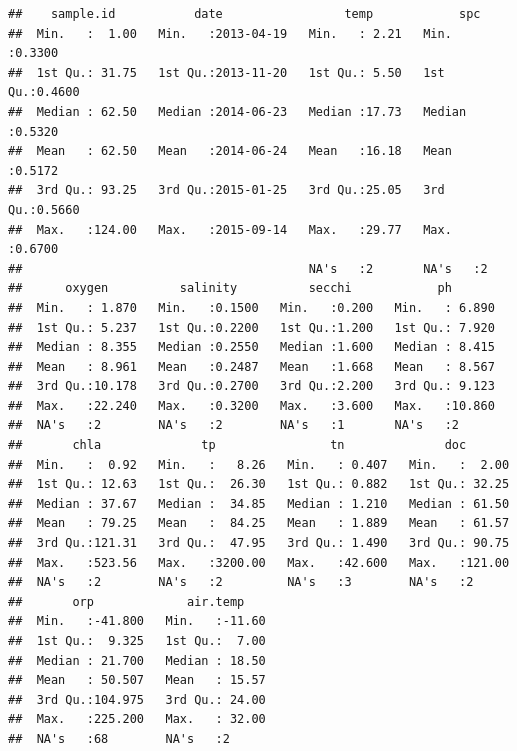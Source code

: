 \documentclass[]{article}
\begin{document}
\begin{verbatim}
##    sample.id           date                 temp            spc        
##  Min.   :  1.00   Min.   :2013-04-19   Min.   : 2.21   Min.   :0.3300  
##  1st Qu.: 31.75   1st Qu.:2013-11-20   1st Qu.: 5.50   1st Qu.:0.4600  
##  Median : 62.50   Median :2014-06-23   Median :17.73   Median :0.5320  
##  Mean   : 62.50   Mean   :2014-06-24   Mean   :16.18   Mean   :0.5172  
##  3rd Qu.: 93.25   3rd Qu.:2015-01-25   3rd Qu.:25.05   3rd Qu.:0.5660  
##  Max.   :124.00   Max.   :2015-09-14   Max.   :29.77   Max.   :0.6700  
##                                        NA's   :2       NA's   :2       
##      oxygen          salinity          secchi            ph        
##  Min.   : 1.870   Min.   :0.1500   Min.   :0.200   Min.   : 6.890  
##  1st Qu.: 5.237   1st Qu.:0.2200   1st Qu.:1.200   1st Qu.: 7.920  
##  Median : 8.355   Median :0.2550   Median :1.600   Median : 8.415  
##  Mean   : 8.961   Mean   :0.2487   Mean   :1.668   Mean   : 8.567  
##  3rd Qu.:10.178   3rd Qu.:0.2700   3rd Qu.:2.200   3rd Qu.: 9.123  
##  Max.   :22.240   Max.   :0.3200   Max.   :3.600   Max.   :10.860  
##  NA's   :2        NA's   :2        NA's   :1       NA's   :2       
##       chla              tp                tn              doc        
##  Min.   :  0.92   Min.   :   8.26   Min.   : 0.407   Min.   :  2.00  
##  1st Qu.: 12.63   1st Qu.:  26.30   1st Qu.: 0.882   1st Qu.: 32.25  
##  Median : 37.67   Median :  34.85   Median : 1.210   Median : 61.50  
##  Mean   : 79.25   Mean   :  84.25   Mean   : 1.889   Mean   : 61.57  
##  3rd Qu.:121.31   3rd Qu.:  47.95   3rd Qu.: 1.490   3rd Qu.: 90.75  
##  Max.   :523.56   Max.   :3200.00   Max.   :42.600   Max.   :121.00  
##  NA's   :2        NA's   :2         NA's   :3        NA's   :2       
##       orp             air.temp     
##  Min.   :-41.800   Min.   :-11.60  
##  1st Qu.:  9.325   1st Qu.:  7.00  
##  Median : 21.700   Median : 18.50  
##  Mean   : 50.507   Mean   : 15.57  
##  3rd Qu.:104.975   3rd Qu.: 24.00  
##  Max.   :225.200   Max.   : 32.00  
##  NA's   :68        NA's   :2
\end{verbatim}
\end{document}
